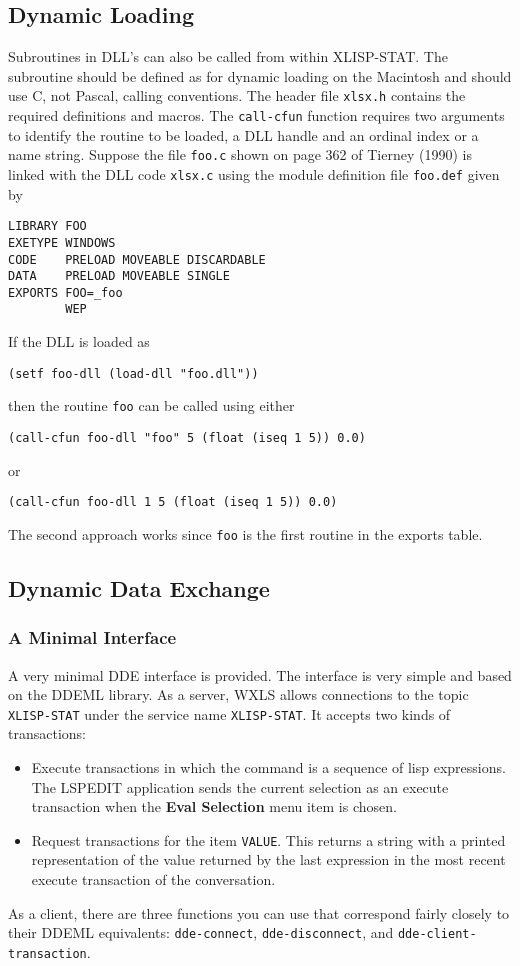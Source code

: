 \documentclass[11pt]{article}
\newcommand{\dcode}[1]{{\tt #1}}
\newcommand{\XLS}{XLISP-STAT}
\newcommand{\lfun}[1]{{\tt #1}}
\begin{document}
\subsection{Dynamic Loading}
Subroutines in DLL's can also be called from within \XLS.  The
subroutine should be defined as for dynamic loading on the Macintosh
and should use C, not Pascal, calling conventions.  The header file
\dcode{xlsx.h} contains the required definitions and macros.  The
\dcode{call-cfun} function requires two arguments to identify the
routine to be loaded, a DLL handle and an ordinal index or a name
string.  Suppose the file \dcode{foo.c} shown on page 362 of Tierney
(1990) is linked with the DLL code \dcode{xlsx.c} using the module
definition file \dcode{foo.def} given by
\begin{verbatim}
LIBRARY FOO
EXETYPE WINDOWS
CODE    PRELOAD MOVEABLE DISCARDABLE
DATA    PRELOAD MOVEABLE SINGLE
EXPORTS FOO=_foo
        WEP
\end{verbatim}
If the DLL is loaded as
\begin{verbatim}
(setf foo-dll (load-dll "foo.dll"))
\end{verbatim}
then the routine \dcode{foo} can be called using either
\begin{verbatim}
(call-cfun foo-dll "foo" 5 (float (iseq 1 5)) 0.0)
\end{verbatim}
or
\begin{verbatim}
(call-cfun foo-dll 1 5 (float (iseq 1 5)) 0.0)
\end{verbatim}
The second approach works since \dcode{foo} is the first routine in
the exports table.

\subsection{Dynamic Data Exchange}
\subsubsection{A Minimal Interface}
A very minimal DDE interface is provided. The interface is very simple
and based on the DDEML library. As a server, WXLS allows connections
to the topic {\tt XLISP-STAT} under the service name {\tt XLISP-STAT}.
It accepts two kinds of transactions:
\begin{itemize}
\item Execute transactions in which the command is a sequence of lisp
  expressions. The LSPEDIT application sends the current selection as
  an execute transaction when the {\bf Eval Selection} menu item is
  chosen.
\item Request transactions for the item {\tt VALUE}. This returns a
  string with a printed representation of the value returned by the
  last expression in the most recent execute transaction of the
  conversation.
\end{itemize}
As a client, there are three functions you can use that correspond
fairly closely to their DDEML equivalents: \lfun{dde-connect},
\lfun{dde-disconnect}, and \lfun{dde-client-transaction}.
\end{document}
